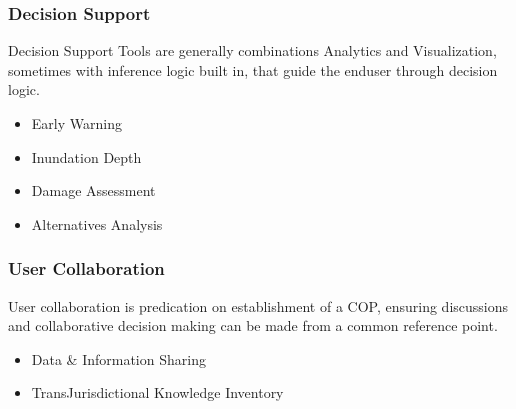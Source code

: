 \documentclass[letterpaper,12pt,english]{book}
\begin{document}
\subsubsection{Decision Support}
\label{\detokenize{requirements/wisdom/dss:decision-support}}\label{\detokenize{requirements/wisdom/dss::doc}}
\sphinxAtStartPar
Decision Support Tools are generally combinations Analytics and Visualization,
sometimes with inference logic built in, that guide the end\sphinxhyphen{}user through
decision logic.
\begin{itemize}
\item {} 
\sphinxAtStartPar
Early Warning

\item {} 
\sphinxAtStartPar
Inundation Depth

\item {} 
\sphinxAtStartPar
Damage Assessment

\item {} 
\sphinxAtStartPar
Alternatives Analysis

\end{itemize}


\subsubsection{User Collaboration}
\label{\detokenize{requirements/wisdom/collaboration:user-collaboration}}\label{\detokenize{requirements/wisdom/collaboration::doc}}
\sphinxAtStartPar
User collaboration is predication on establishment of a COP, ensuring
discussions and collaborative decision making can be made from a common
reference point.
\begin{itemize}
\item {} 
\sphinxAtStartPar
Data \& Information Sharing

\item {} 
\sphinxAtStartPar
Trans\sphinxhyphen{}Jurisdictional Knowledge Inventory

\end{itemize}
\end{document}
